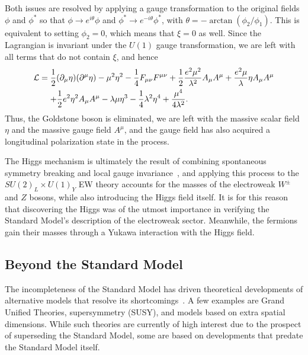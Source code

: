 Both issues are resolved by applying a gauge transformation to the original fields $\phi$ and $\phi^*$ so that $\phi\to e^{i\theta}\phi$ and $\phi^*\to e^{-i\theta}\phi^*$, with $\theta=-\arctan(\phi_2/\phi_1)$.
This is equivalent to setting $\phi_2=0$, which means that $\xi=0$ as well.
Since the Lagrangian is invariant under the $U(1)$ gauge transformation, we are left with all terms that do not contain $\xi$, and hence
\begin{equation}
  \begin{aligned}
    \mathcal{L} &= \frac{1}{2}(\partial_\mu\eta)(\partial^\mu\eta)-\mu^2\eta^2-\frac{1}{4}F_{\mu\nu}F^{\mu\nu}+\frac{1}{2}\frac{e^2\mu^2}{\lambda^2}A_\mu A^\mu+\frac{e^2\mu}{\lambda}\eta A_\mu A^\mu\\
    &\equad+ \frac{1}{2}e^2\eta^2A_\mu A^\mu-\lambda\mu\eta^3-\frac{1}{4}\lambda^2\eta^4+\frac{\mu^4}{4\lambda^2}.
  \end{aligned}
\end{equation}
Thus, the Goldstone boson is eliminated, we are left with the massive scalar field $\eta$ and the massive gauge field $A^\mu$, and the gauge field has also acquired a longitudinal polarization state in the process.

The Higgs mechanism is ultimately the result of combining spontaneous symmetry breaking and local gauge invariance~\cite{Higgs:1964ia}, and applying this process to the $SU(2)_L\times U(1)_Y$ EW theory accounts for the masses of the electroweak $W^\pm$ and $Z$ bosons, while also introducing the Higgs field itself.
It is for this reason that discovering the Higgs was of the utmost importance in verifying the Standard Model's description of the electroweak sector.
Meanwhile, the fermions gain their masses through a Yukawa interaction with the Higgs field.

\subsection{Beyond the Standard Model}
\label{subsec:BSM}

The incompleteness of the Standard Model has driven theoretical developments of alternative models that resolve its shortcomings~\cite{2010arXiv1005.1676L}.
A few examples are Grand Unified Theories, supersymmetry (SUSY), and models based on extra spatial dimensions.
While such theories are currently of high interest due to the prospect of superseding the Standard Model, some are based on developments that predate the Standard Model itself.

